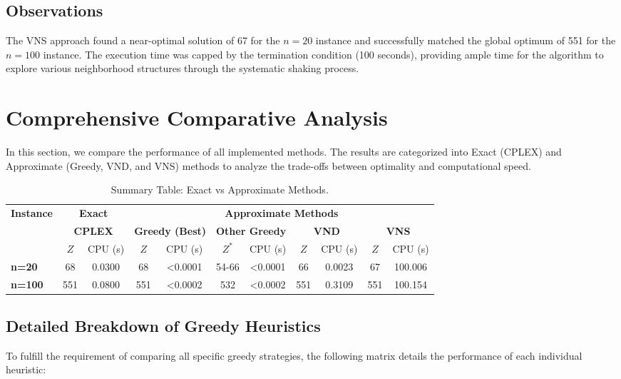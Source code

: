 \documentclass[11pt,a4paper]{article}
\begin{document}
\subsection{Observations}
The VNS approach found a near-optimal solution of 67 for the $n=20$ instance and successfully matched the global optimum of 551 for the $n=100$ instance. The execution time was capped by the termination condition (100 seconds), providing ample time for the algorithm to explore various neighborhood structures through the systematic shaking process.

\section{Comprehensive Comparative Analysis}
In this section, we compare the performance of all implemented methods. The results are categorized into Exact (CPLEX) and Approximate (Greedy, VND, and VNS) methods to analyze the trade-offs between optimality and computational speed.

\begin{table}[htbp]
    \centering
    \footnotesize
    \begin{tabular}{|l|cc|cc|cc|cc|cc|}
        \hline
        \multirow{3}{*}{\textbf{Instance}} & \multicolumn{2}{c|}{\textbf{Exact}} & \multicolumn{8}{c|}{\textbf{Approximate Methods}} \\
        \cline{2-11}
        & \multicolumn{2}{c|}{\textbf{CPLEX}} & \multicolumn{2}{c|}{\textbf{Greedy (Best)}} & \multicolumn{2}{c|}{\textbf{Other Greedy}} & \multicolumn{2}{c|}{\textbf{VND}} & \multicolumn{2}{c|}{\textbf{VNS}} \\
        \cline{2-11}
        & $Z$ & CPU (s) & $Z$ & CPU (s) & $Z^*$ & CPU (s) & $Z$ & CPU (s) & $Z$ & CPU (s) \\
        \hline
        \textbf{n=20} & 68 & 0.0300 & 68 & <0.0001 & 54-66 & <0.0001 & 66 & 0.0023 & 67 & 100.006 \\
        \hline
        \textbf{n=100} & 551 & 0.0800 & 551 & <0.0002 & 532 & <0.0002 & 551 & 0.3109 & 551 & 100.154 \\
        \hline
    \end{tabular}
    \caption{Summary Table: Exact vs Approximate Methods.}
\end{table}

\subsection{Detailed Breakdown of Greedy Heuristics}
To fulfill the requirement of comparing all specific greedy strategies, the following matrix details the performance of each individual heuristic:
\end{document}
